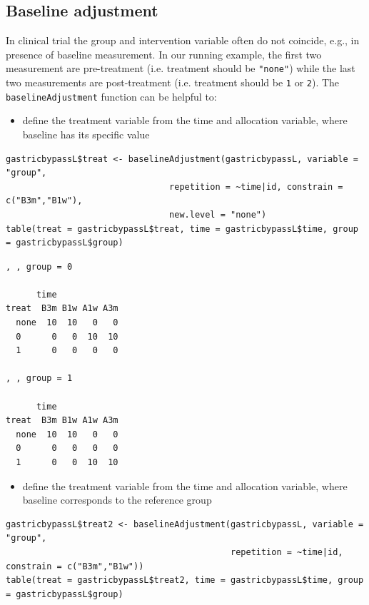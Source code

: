 \documentclass[12pt]{article}
\begin{document}
\clearpage

\subsection{Baseline adjustment}
\label{sec:orgf1beecf}

In clinical trial the group and intervention variable often do not
coincide, e.g., in presence of baseline measurement. In our running
example, the first two measurement are pre-treatment (i.e. treatment
should be \texttt{"none"}) while the last two measurements are post-treatment
(i.e. treatment should be \texttt{1} or \texttt{2}). The \texttt{baselineAdjustment}
function can be helpful to:
\begin{itemize}
\item define the treatment variable from the time and allocation variable, where baseline has its specific value
\end{itemize}
\lstset{language=r,label= ,caption= ,captionpos=b,numbers=none}
\begin{lstlisting}
gastricbypassL$treat <- baselineAdjustment(gastricbypassL, variable = "group",
                                repetition = ~time|id, constrain = c("B3m","B1w"),
                                new.level = "none")
table(treat = gastricbypassL$treat, time = gastricbypassL$time, group = gastricbypassL$group)
\end{lstlisting}

\begin{verbatim}
, , group = 0

      time
treat  B3m B1w A1w A3m
  none  10  10   0   0
  0      0   0  10  10
  1      0   0   0   0

, , group = 1

      time
treat  B3m B1w A1w A3m
  none  10  10   0   0
  0      0   0   0   0
  1      0   0  10  10
\end{verbatim}

\begin{itemize}
\item define the treatment variable from the time and allocation variable,
where baseline corresponds to the reference group
\end{itemize}
\lstset{language=r,label= ,caption= ,captionpos=b,numbers=none}
\begin{lstlisting}
gastricbypassL$treat2 <- baselineAdjustment(gastricbypassL, variable = "group",
                                            repetition = ~time|id, constrain = c("B3m","B1w"))
table(treat = gastricbypassL$treat2, time = gastricbypassL$time, group = gastricbypassL$group)
\end{lstlisting}
\end{document}
